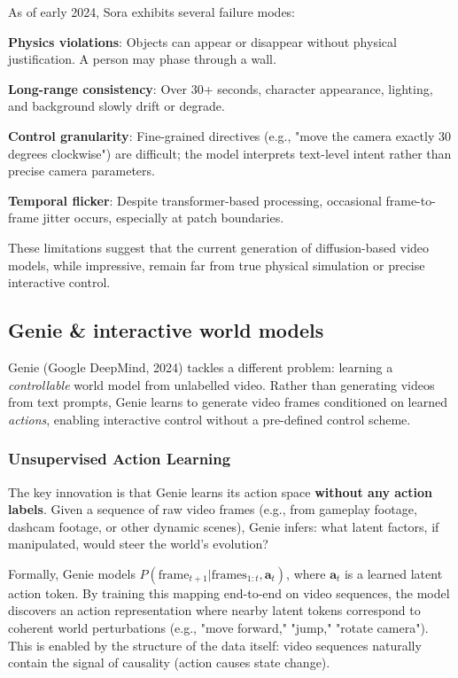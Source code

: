 As of early 2024, Sora exhibits several failure modes:
\begin{warnbox}
\textbf{Physics violations}: Objects can appear or disappear without physical justification. A person may phase through a wall.

\textbf{Long-range consistency}: Over 30+ seconds, character appearance, lighting, and background slowly drift or degrade.

\textbf{Control granularity}: Fine-grained directives (e.g., "move the camera exactly 30 degrees clockwise") are difficult; the model interprets text-level intent rather than precise camera parameters.

\textbf{Temporal flicker}: Despite transformer-based processing, occasional frame-to-frame jitter occurs, especially at patch boundaries.
\end{warnbox}

These limitations suggest that the current generation of diffusion-based video models, while impressive, remain far from true physical simulation or precise interactive control.

\subsection{Genie \& interactive world models}

Genie (Google DeepMind, 2024) tackles a different problem: learning a \emph{controllable} world model from unlabelled video. Rather than generating videos from text prompts, Genie learns to generate video frames conditioned on learned \emph{actions}, enabling interactive control without a pre-defined control scheme.

\subsubsection{Unsupervised Action Learning}

The key innovation is that Genie learns its action space \textbf{without any action labels}. Given a sequence of raw video frames (e.g., from gameplay footage, dashcam footage, or other dynamic scenes), Genie infers: what latent factors, if manipulated, would steer the world's evolution?

Formally, Genie models $P(\text{frame}_{t+1} | \text{frames}_{1:t}, \mathbf{a}_t)$, where $\mathbf{a}_t$ is a learned latent action token. By training this mapping end-to-end on video sequences, the model discovers an action representation where nearby latent tokens correspond to coherent world perturbations (e.g., "move forward," "jump," "rotate camera"). This is enabled by the structure of the data itself: video sequences naturally contain the signal of causality (action causes state change).

